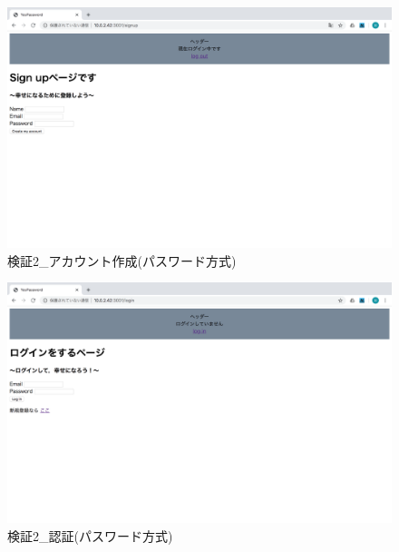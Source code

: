     \vspace{4cm}%
    \begin{figure}[H]
        \includegraphics[width=15cm]{./fig/chapter4/inspect_2/password_screnn/sign_up.png}
        \caption{検証2\_アカウント作成(パスワード方式)}
        \label{検証２アカウント作成(パスワード方式)}
    \end{figure}

    \vspace{4cm}%
    \begin{figure}[H]
        \includegraphics[width=15cm]{./fig/chapter4/inspect_2/password_screnn/login.png}
        \caption{検証2\_認証(パスワード方式)}
        \label{検証２認証(パスワード方式)}
    \end{figure}

